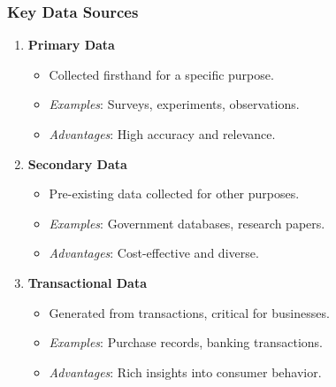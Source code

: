 \documentclass[aspectratio=169]{beamer}
\begin{document}
\begin{frame}[fragile]
    \frametitle{Key Data Sources}
    \begin{enumerate}
        \item \textbf{Primary Data}
            \begin{itemize}
                \item Collected firsthand for a specific purpose.
                \item \textit{Examples}: Surveys, experiments, observations.
                \item \textit{Advantages}: High accuracy and relevance.
            \end{itemize}
            
        \item \textbf{Secondary Data}
            \begin{itemize}
                \item Pre-existing data collected for other purposes.
                \item \textit{Examples}: Government databases, research papers.
                \item \textit{Advantages}: Cost-effective and diverse.
            \end{itemize}
    
        \item \textbf{Transactional Data}
            \begin{itemize}
                \item Generated from transactions, critical for businesses.
                \item \textit{Examples}: Purchase records, banking transactions.
                \item \textit{Advantages}: Rich insights into consumer behavior.
            \end{itemize}
    \end{enumerate}
\end{frame}
\end{document}
